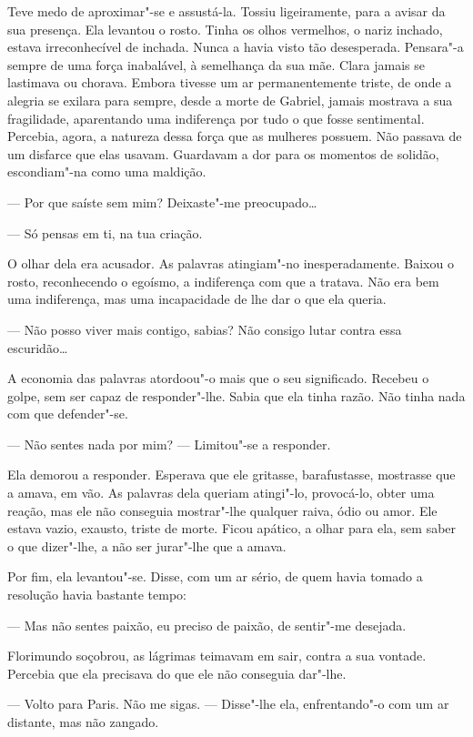 Teve medo de aproximar"-se e assustá-la. Tossiu ligeiramente, para a
avisar da sua presença. Ela levantou o rosto. Tinha os olhos vermelhos,
o nariz inchado, estava irreconhecível de inchada. Nunca a havia visto
tão desesperada. Pensara"-a sempre de uma força inabalável, à semelhança
da sua mãe. Clara jamais se lastimava ou chorava. Embora tivesse um ar
permanentemente triste, de onde a alegria se exilara para sempre, desde
a morte de Gabriel, jamais mostrava a sua fragilidade, aparentando uma
indiferença por tudo o que fosse sentimental. Percebia, agora, a
natureza dessa força que as mulheres possuem. Não passava de um disfarce
que elas usavam. Guardavam a dor para os momentos de solidão,
escondiam"-na como uma maldição.

--- Por que saíste sem mim? Deixaste"-me preocupado\ldots{}

--- Só pensas em ti, na tua criação.

O olhar dela era acusador. As palavras atingiam"-no inesperadamente.
Baixou o rosto, reconhecendo o egoísmo, a indiferença com que a tratava.
Não era bem uma indiferença, mas uma incapacidade de lhe dar o que ela
queria.

--- Não posso viver mais contigo, sabias? Não consigo lutar contra essa
escuridão\ldots{}

A economia das palavras atordoou"-o mais que o seu significado. Recebeu o
golpe, sem ser capaz de responder"-lhe. Sabia que ela tinha razão. Não
tinha nada com que defender"-se.

--- Não sentes nada por mim? ---  Limitou"-se a responder.

Ela demorou a responder. Esperava que ele gritasse, barafustasse,
mostrasse que a amava, em vão. As palavras dela queriam atingi"-lo,
provocá-lo, obter uma reação, mas ele não conseguia mostrar"-lhe
qualquer raiva, ódio ou amor. Ele estava vazio, exausto, triste de
morte. Ficou apático, a olhar para ela, sem saber o que dizer"-lhe, a não
ser jurar"-lhe que a amava.

Por fim, ela levantou"-se. Disse, com um ar sério, de quem havia tomado a
resolução havia bastante tempo:

--- Mas não sentes paixão, eu preciso de paixão, de sentir"-me desejada.

Florimundo soçobrou, as lágrimas teimavam em sair, contra a sua vontade.
Percebia que ela precisava do que ele não conseguia dar"-lhe.

--- Volto para Paris. Não me sigas. ---  Disse"-lhe ela, enfrentando"-o com um
ar distante, mas não zangado.

